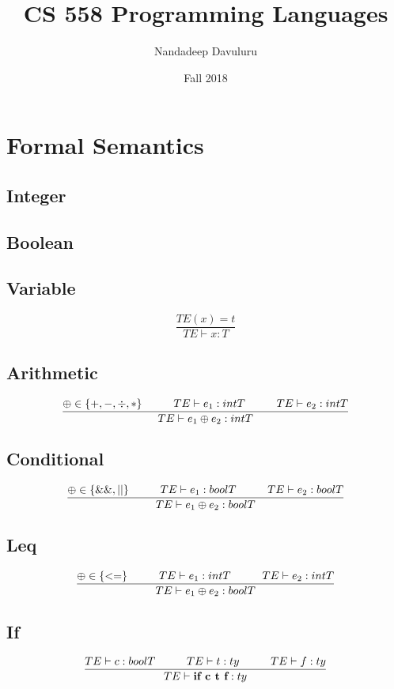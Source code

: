 \documentclass{article}
\title{CS 558 Programming Languages}
\author{Nandadeep Davuluru}
\date{Fall 2018}
\newcommand\tab[1][1cm]{\hspace*{#1}}
\begin{document}
\maketitle

\section{Formal Semantics}

    \subsection{Integer}
    
    \subsection{Boolean}
    \subsection{Variable}
        \begin{equation}
            \frac{TE(x) = t}{TE \vdash x : T}
        \end{equation}
    \subsection{Arithmetic}
        \begin{equation}
            \frac{\oplus \in \{+, -, \div, *\} \tab TE \vdash e_1 : intT \tab TE \vdash e_2 : intT}{TE \vdash e_1 \oplus e_2 : intT}
        \end{equation}
    \subsection{Conditional}
        \begin{equation}
            \frac{\oplus \in \{\&\&, || \} \tab TE \vdash e_1 : boolT \tab TE \vdash e_2 : boolT}{TE \vdash e_1 \oplus e_2 : boolT}
        \end{equation}
    \subsection{Leq}
        \begin{equation}
            \frac{\oplus \in \{ <= \} \tab TE \vdash e_1 : intT \tab TE \vdash e_2 : intT}{TE \vdash e_1 \oplus e_2 : boolT}
        \end{equation}
    \subsection{If}
         \begin{equation}
            \frac{TE \vdash c : boolT \tab TE \vdash t : ty \tab TE \vdash f : ty}{TE \vdash \textbf{if c t f} : ty}
        \end{equation}
\end{document}
